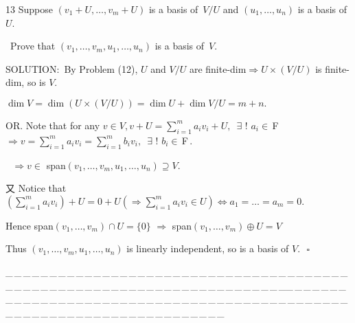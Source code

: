 \documentclass[a4paper, 11pt, UTF8]{article}
\def\Fbf{$\,{\timesbf F}\,$}
\begin{document}
\begin{large}
{\timesbf\Large 13} {\timessl\Large 
Suppose $(v_1+U,\dots,v_m+U)$ is a basis of \,$V/U$ and $(u_1,\dots,u_n)$ is a basis of $U$.}\par\quad\,
{\timessl\Large Prove that $(v_1,\dots,v_m,u_1,\dots,u_n)$ is a basis of \,$V$.}\par
{\timesbf S\footnotesize{OLUTION:}}\,\,\,By Problem (12), $U$ and $V/U$ are finite-dim$\Rightarrow U\times(V/U)$ is finite-dim, so is $V$.\par\quad
$\dim V=\dim(U\times(V/U))=\dim U+\dim V/U=m+n.$\par\quad
{O{\small R}}. Note that for any $v\in V,v+U=\sum\limits_{i=1}^m a_i v_i+U,\,\,\,\exists\,\,!\,\,a_i\in\Fbf\Rightarrow v=\sum\limits_{i=1}^m a_i v_i=\sum\limits_{i=1}^m b_i v_i,\,\,\,\exists\,\,!\,\,b_i\in\Fbf.$\par\qquad\qquad\qquad\qquad\,\,
$\Rightarrow v\in$ span$(v_1,\dots,v_m,u_1,\dots,u_n)\supseteq V$.\par\quad
又 Notice that $(\sum\limits_{i=1}^m a_i v_i)+U=0+U(\Rightarrow\sum\limits_{i=1}^m a_i v_i\in U)\Longleftrightarrow a_1=\dots=a_m=0.$\par\quad
Hence span$(v_1,\dots,v_m)\cap U=\{0\}$
$\Rightarrow$ span$(v_1,\dots,v_m)\oplus U=V$\par\quad
Thus $(v_1,\dots,v_m,u_1,\dots,u_n)$ is linearly independent, so is a basis of $V.\,\,\,\,\square$\par
{\tiny \_\,\_\,\_\,\_\,\_\,\_\,\_\,\_\,\_\,\_\,\_\,\_\,\_\,\_\,\_\,\_\,\_\,\_\,\_\,\_\,\_\,\_\,\_\,\_\,\_\,\_\,\_\,\_\,\_\,\_\,\_\,\_\,\_\,\_\,\_\,\_\,\_\,\_\,\_\,\_\,\_\,\_\,\_\,\_\,\_\,\_\,\_\,\_\,\_\,\_\,\_\,\_\,\_\,\_\,\_\,\_\,\_\,\_\,\_\,\_\,\_\,\_\,\_\,\_\,\_\,\_\,\_\,\_\,\_\,\_\,\_\_\,\_\,\_\,\_\,\_\,\_\,\_\,\_\,\_\,\_\,\_\,\_\,\_\,\_\,\_\,\_\,\_\,\_\,\_\,\_\,\_\,\_\,\_\,\_\,\_\,\_\,\_\,\_\,\_\,\_\,\_\,\_\,\_\,\_\,\_\,\_\,\_\,\_\,\_\,\_\,\_\,\_\,\_\,\_\,\_\,\_\,\_\,\_\,\_\,\_\,\_\,\_\,\_\,\_\,\_\,\_\,\_\,\_\,\_\,\_\,\_\,\_\,\_\,\_\,\_\,\_\,\_\,\_\,\_\,\_\,\_}\par


\end{large}
\end{document}
